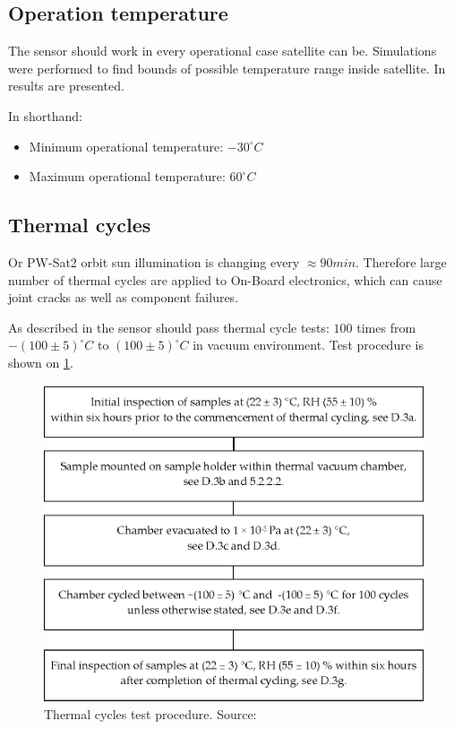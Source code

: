 \subsection{Operation temperature}
	The sensor should work in every operational case satellite can be. Simulations were performed to find bounds of possible temperature range inside satellite.	In \cite{PWSAT_TCS_CDR} results are presented. 
	
	In shorthand:
	\begin{itemize}
		\item Minimum operational temperature: $-30^\circ C$
		\item Maximum operational temperature: $60^\circ C$
	\end{itemize}


\subsection{Thermal cycles}
	Or PW-Sat2 orbit sun illumination is changing every $\approx 90min$. Therefore large number of thermal cycles are applied to On-Board electronics, which can cause joint cracks as well as component failures. 
	
	As described in \cite{ECSS_Q_ST_70_04C} the sensor should pass thermal cycle tests: $100$ times from $- (100 \pm 5)^\circ C$ to $(100 \pm 5)^\circ C$ in vacuum environment. Test procedure is shown on \ref{thermal_tests}.
	
	\begin{figure}[H]
		\centering
		\includegraphics[width=0.5\paperwidth]{img/thermal_cycles.eps}
		\caption{Thermal cycles test procedure. Source: \cite{ECSS_Q_ST_70_04C}}
		\label{thermal_tests}
	\end{figure}
